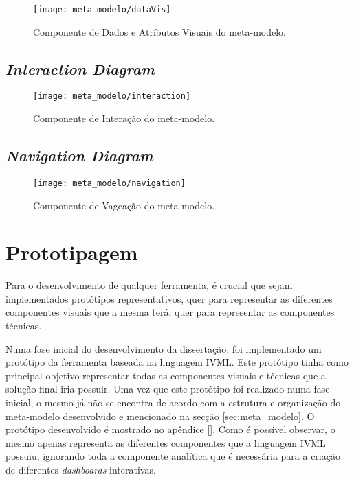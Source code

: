 \begin{figure}[htbp]
  \texttt{[image: meta\_modelo/dataVis]}
  \caption{Componente de Dados e Atríbutos Visuais do meta-modelo.}
  \label{fig:comp_anal_struct}
\end{figure}

\subsection{\textit{Interaction Diagram}} %
\label{sub:int_diagram}

\begin{figure}[htbp]
  \texttt{[image: meta\_modelo/interaction]}
  \caption{Componente de Interação do meta-modelo.}
  \label{fig:comp_anal_struct}
\end{figure}

\subsection{\textit{Navigation Diagram}} %
\label{sub:nav_diagram}

\begin{figure}[htbp]
  \texttt{[image: meta\_modelo/navigation]}
  \caption{Componente de Vageação do meta-modelo.}
  \label{fig:comp_anal_struct}
\end{figure}

\section{Prototipagem} %
\label{sec:prototipagem}

Para o desenvolvimento de qualquer ferramenta, é crucial que sejam implementados protótipos representativos, quer para representar as diferentes componentes visuais que a mesma terá, quer para representar as componentes técnicas.

Numa fase inicial do desenvolvimento da dissertação, foi implementado um protótipo da ferramenta baseada na linguagem \gls{IVML}. Este protótipo tinha como principal objetivo representar todas as componentes visuais e técnicas que a solução final iria possuir. Uma vez que este protótipo foi realizado numa fase inicial, o mesmo já não se encontra de acordo com a estrutura e organização do meta-modelo desenvolvido e mencionado na secção \ref{sec:meta_modelo}. O protótipo desenvolvido é mostrado no apêndice \ref{}. Como é possível observar, o mesmo apenas representa as diferentes componentes que a linguagem \gls{IVML} possuiu, ignorando toda a componente analítica que é necessária para a criação de diferentes \textit{dashboards} interativas.

